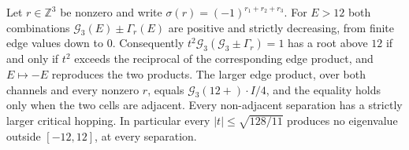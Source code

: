 \begin{proposition}
\label{prop:j3max}
Let \(r\in\mathbb{Z}^3\) be nonzero and write \(\sigma(r)=(-1)^{r_1+r_2+r_3}\).
For \(E>12\) both combinations \(\mathcal{G}_3(E)\pm\Gamma_r(E)\) are positive
and strictly decreasing, from finite edge values down to \(0\).
Consequently \(t^2\mathcal{G}_3(\mathcal{G}_3\pm\Gamma_r)=1\) has a root above
\(12\) if and only if \(t^2\) exceeds the reciprocal of the corresponding
edge product, and \(E\mapsto -E\) reproduces the two products.
The larger edge product, over both channels and every nonzero \(r\),
equals \(\mathcal{G}_3(12+)\cdot I/4\), and the equality holds only when
the two cells are adjacent.
Every non-adjacent separation has a strictly larger critical hopping.
In particular every \(|t|\le\sqrt{128/11}\) produces no eigenvalue outside
\([-12,12]\), at every separation.
\end{proposition}

